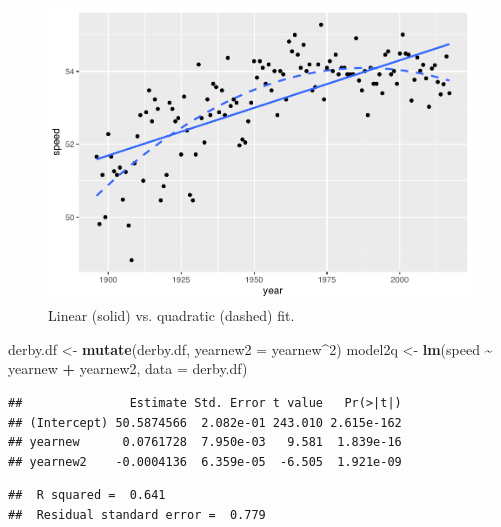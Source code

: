 \documentclass[
]{krantz}
\newenvironment{Shaded}{\begin{snugshade}}{\end{snugshade}}
\newcommand{\AttributeTok}[1]{\textcolor[rgb]{0.27,0.27,0.27}{#1}}
\newcommand{\DecValTok}[1]{\textcolor[rgb]{0.06,0.06,0.06}{#1}}
\newcommand{\FunctionTok}[1]{\textcolor[rgb]{0.27,0.27,0.27}{\textbf{#1}}}
\newcommand{\NormalTok}[1]{#1}
\newcommand{\OtherTok}[1]{\textcolor[rgb]{0.37,0.37,0.37}{#1}}
\newcommand{\SpecialCharTok}[1]{\textcolor[rgb]{0.43,0.43,0.43}{\textbf{#1}}}
\begin{document}
\begin{figure}

{\centering \includegraphics[width=0.9\linewidth]{bookdown-BeyondMLR_files/figure-latex/models2and2q-1} 

}

\caption{Linear (solid) vs. quadratic (dashed) fit.}\label{fig:models2and2q}
\end{figure}

\begin{Shaded}
\begin{Highlighting}[]
\NormalTok{derby.df }\OtherTok{\textless{}{-}} \FunctionTok{mutate}\NormalTok{(derby.df, }\AttributeTok{yearnew2 =}\NormalTok{ yearnew}\SpecialCharTok{\^{}}\DecValTok{2}\NormalTok{)}
\NormalTok{model2q }\OtherTok{\textless{}{-}} \FunctionTok{lm}\NormalTok{(speed }\SpecialCharTok{\textasciitilde{}}\NormalTok{ yearnew }\SpecialCharTok{+}\NormalTok{ yearnew2, }\AttributeTok{data =}\NormalTok{ derby.df)}
\end{Highlighting}
\end{Shaded}

\begin{verbatim}
##               Estimate Std. Error t value   Pr(>|t|)
## (Intercept) 50.5874566  2.082e-01 243.010 2.615e-162
## yearnew      0.0761728  7.950e-03   9.581  1.839e-16
## yearnew2    -0.0004136  6.359e-05  -6.505  1.921e-09
\end{verbatim}

\begin{verbatim}
##  R squared =  0.641 
##  Residual standard error =  0.779
\end{verbatim}
\end{document}

